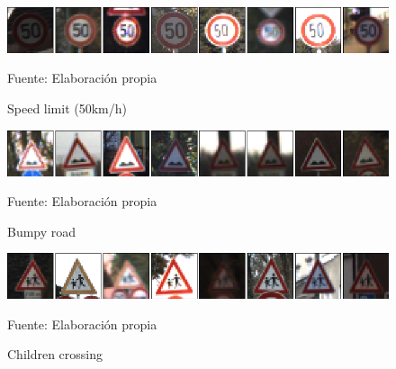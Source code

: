 			\begin{figure}[H]
				\begin{center}
				\includegraphics[width=1\textwidth]{images/desarrollo/imagenes/alemania/1__(3).png}
				\end{center}
				\begin{center}
				\caption{\small{Speed limit (50km/h)}}
				\vskip -0.25cm
				{\small{Fuente: Elaboración propia}}
				\end{center}
				\vspace{-1.5em}
			\end{figure}

			
			\begin{figure}[H]
				\begin{center}
				\includegraphics[width=1\textwidth]{images/desarrollo/imagenes/alemania/1__(23).png}
				\end{center}
				\begin{center}
				\caption{\small{Bumpy road}}
				\vskip -0.25cm
				{\small{Fuente: Elaboración propia}}
				\end{center}
				\vspace{-1.5em}
			\end{figure}

			\begin{figure}[H]
				\begin{center}
				\includegraphics[width=1\textwidth]{images/desarrollo/imagenes/alemania/1__(29).png}
				\end{center}
				\begin{center}
				\vskip -0.25cm
				{\small{Fuente: Elaboración propia}}
				\caption{\small{Children crossing}}
				\end{center}
				\vspace{-1.5em}
			\end{figure}
			

